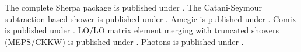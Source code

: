 \documentclass{article}
\begin{document}
The complete Sherpa package is published under \cite{Gleisberg:2008ta}.
The Catani-Seymour subtraction based shower is published under \cite{Schumann:2007mg}.
Amegic is published under \cite{Krauss:2001iv}.
Comix is published under \cite{Gleisberg:2008fv}.
LO/LO matrix element merging with truncated showers (MEPS/CKKW) is published under \cite{Hoeche:2009rj}.
Photons is published under \cite{Schonherr:2008av}.
\end{document}
